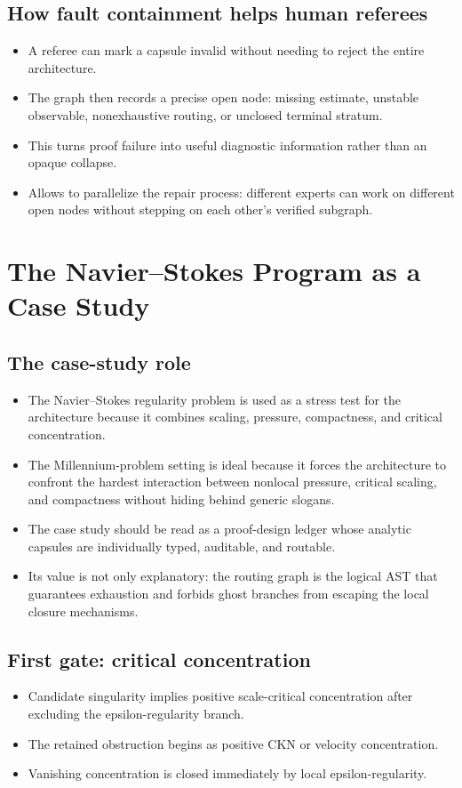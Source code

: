\documentclass[11pt]{article}
\theoremstyle{plain}
\theoremstyle{definition}
\theoremstyle{remark}
\newcommand{\NS}{Navier--Stokes}
\begin{document}
\subsection{How fault containment helps human referees}
\begin{itemize}
  \item A referee can mark a capsule invalid without needing to reject the entire architecture.
  \item The graph then records a precise open node: missing estimate, unstable observable, nonexhaustive routing, or unclosed terminal stratum.
  \item This turns proof failure into useful diagnostic information rather than an opaque collapse.
  \item Allows to parallelize the repair process: different experts can work on different open nodes without stepping on each other's verified subgraph.
\end{itemize}

\section{The Navier--Stokes Program as a Case Study}
\label{sec:ns-case-study}

\subsection{The case-study role}
\begin{itemize}
  \item The \NS{} regularity problem is used as a stress test for the architecture because it combines scaling, pressure, compactness, and critical concentration.
  \item The Millennium-problem setting is ideal because it forces the architecture to confront the hardest interaction between nonlocal pressure, critical scaling, and compactness without hiding behind generic slogans.
  \item The case study should be read as a proof-design ledger whose analytic capsules are individually typed, auditable, and routable.
  \item Its value is not only explanatory: the routing graph is the logical AST that guarantees exhaustion and forbids ghost branches from escaping the local closure mechanisms.
\end{itemize}

\subsection{First gate: critical concentration}
\begin{itemize}
  \item Candidate singularity implies positive scale-critical concentration after excluding the epsilon-regularity branch.
  \item The retained obstruction begins as positive CKN or velocity concentration.
  \item Vanishing concentration is closed immediately by local epsilon-regularity.
\end{itemize}
\end{document}
